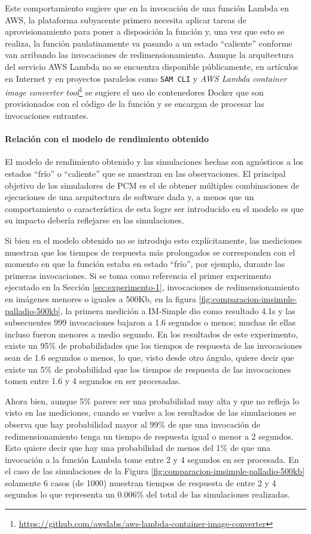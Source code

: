 Este comportamiento sugiere que en la invocación de una función Lambda en AWS, la plataforma subyacente primero necesita aplicar tareas de aprovisionamiento para poner a disposición la función y, una vez que esto se realiza, la función paulatinamente va pasando a un estado ``caliente'' conforme van arribando las invocaciones de redimensionamiento. Aunque la arquitectura del servicio AWS Lambda no se encuentra disponible públicamente, en artículos en Internet y en proyectos paralelos como \texttt{SAM CLI} y \emph{AWS Lambda container image converter tool}\footnote{\url{https://github.com/awslabs/aws-lambda-container-image-converter}} se sugiere el uso de contenedores Docker que son provisionados con el código de la función y se encargan de procesar las invocaciones entrantes. 

\paragraph{Relación con el modelo de rendimiento obtenido} El modelo de rendimiento obtenido y las simulaciones hechas son agnósticos a los estados ``frío'' o ``caliente'' que se muestran en las observaciones. El principal objetivo de los simuladores de PCM es el de obtener múltiples combinaciones de ejecuciones de una arquitectura de software dada y, a menos que un comportamiento o característica de esta logre ser introducido en el modelo es que su impacto debería reflejarse en las simulaciones.

Si bien en el modelo obtenido no se introdujo esto explícitamente, las mediciones muestran que los tiempos de respuesta más prolongados se corresponden con el momento en que la función estaba en estado ``frío'', por ejemplo, durante las primeras invocaciones. Si se toma como referencia el primer experimento ejecutado en la Sección \ref{sec:experimento-1}, invocaciones de redimensionamiento en imágenes menores o iguales a 500Kb, en la figura \ref{fig:comparacion-imsimple-palladio-500kb}, la primera medición a IM-Simple dio como resultado 4.1s y las subsecuentes 999 invocaciones bajaron a 1.6 segundos o menos; muchas de ellas incluso fueron menores a medio segundo. En los resultados de este experimento, existe un 95\% de probabilidades que los tiempos de respuesta de las invocaciones sean de 1.6 segundos o menos, lo que, visto desde otro ángulo, quiere decir que existe un 5\% de probabilidad que los tiempos de respuesta de las  invocaciones tomen entre 1.6 y 4 segundos en ser procesadas. 

Ahora bien, aunque 5\% parece ser una probabilidad muy alta y que no refleja lo visto en las mediciones, cuando se vuelve a los resultados de las simulaciones se observa que hay probabilidad mayor al 99\% de que una invocación de redimensionamiento tenga un tiempo de respuesta igual o menor a 2 segundos. Esto quiere decir que hay una probabilidad de menos del 1\% de que una invocación a la función Lambda tome entre 2 y 4 segundos en ser procesada. En el caso de las simulaciones de la Figura \ref{fig:comparacion-imsimple-palladio-500kb} solamente 6 casos (de 1000) muestran tiempos de respuesta de entre 2 y 4 segundos lo que representa un 0.006\% del total de las simulaciones realizadas.

